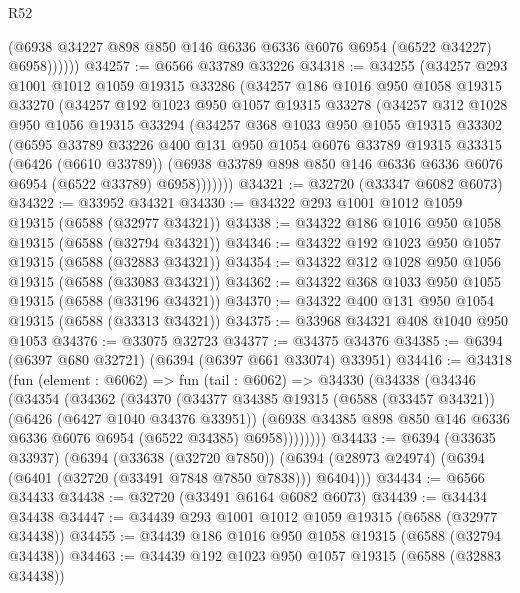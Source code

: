 \begin{lexlean}{R52}
\begin{coremodule}
              (@6938 @34227 @898 @850 @146 @6336 @6336 @6076 @6954 (@6522 @34227) @6958))))))
@34257 := @6566 @33789 @33226
@34318 := @34255
    (@34257
      @293
      @1001
      @1012
      @1059
      @19315
      @33286
      (@34257
        @186
        @1016
        @950
        @1058
        @19315
        @33270
        (@34257
          @192
          @1023
          @950
          @1057
          @19315
          @33278
          (@34257
            @312
            @1028
            @950
            @1056
            @19315
            @33294
            (@34257
              @368
              @1033
              @950
              @1055
              @19315
              @33302
              (@6595
                @33789
                @33226
                @400
                @131
                @950
                @1054
                @6076
                @33789
                @19315
                @33315
                (@6426 (@6610 @33789))
                (@6938 @33789 @898 @850 @146 @6336 @6336 @6076 @6954 (@6522 @33789) @6958)))))))
@34321 := @32720 (@33347 @6082 @6073)
@34322 := @33952 @34321
@34330 := @34322 @293 @1001 @1012 @1059 @19315 (@6588 (@32977 @34321))
@34338 := @34322 @186 @1016 @950 @1058 @19315 (@6588 (@32794 @34321))
@34346 := @34322 @192 @1023 @950 @1057 @19315 (@6588 (@32883 @34321))
@34354 := @34322 @312 @1028 @950 @1056 @19315 (@6588 (@33083 @34321))
@34362 := @34322 @368 @1033 @950 @1055 @19315 (@6588 (@33196 @34321))
@34370 := @34322 @400 @131 @950 @1054 @19315 (@6588 (@33313 @34321))
@34375 := @33968 @34321 @408 @1040 @950 @1053
@34376 := @33075 @32723
@34377 := @34375 @34376
@34385 := @6394 (@6397 @680 @32721) (@6394 (@6397 @661 @33074) @33951)
@34416 := @34318
    (fun (element : @6062) =>
    fun (tail : @6062) =>
    @34330
      (@34338
        (@34346
          (@34354
            (@34362
              (@34370
                (@34377
                  @34385
                  @19315
                  (@6588 (@33457 @34321))
                  (@6426 (@6427 @1040 @34376 @33951))
                  (@6938 @34385 @898 @850 @146 @6336 @6336 @6076 @6954 (@6522 @34385) @6958))))))))
@34433 := @6394
    (@33635 @33937)
    (@6394
      (@33638 (@32720 @7850))
      (@6394 (@28973 @24974) (@6394 (@6401 (@32720 (@33491 @7848 @7850 @7838))) @6404)))
@34434 := @6566 @34433
@34438 := @32720 (@33491 @6164 @6082 @6073)
@34439 := @34434 @34438
@34447 := @34439 @293 @1001 @1012 @1059 @19315 (@6588 (@32977 @34438))
@34455 := @34439 @186 @1016 @950 @1058 @19315 (@6588 (@32794 @34438))
@34463 := @34439 @192 @1023 @950 @1057 @19315 (@6588 (@32883 @34438))

\end{coremodule}
\end{lexlean}
